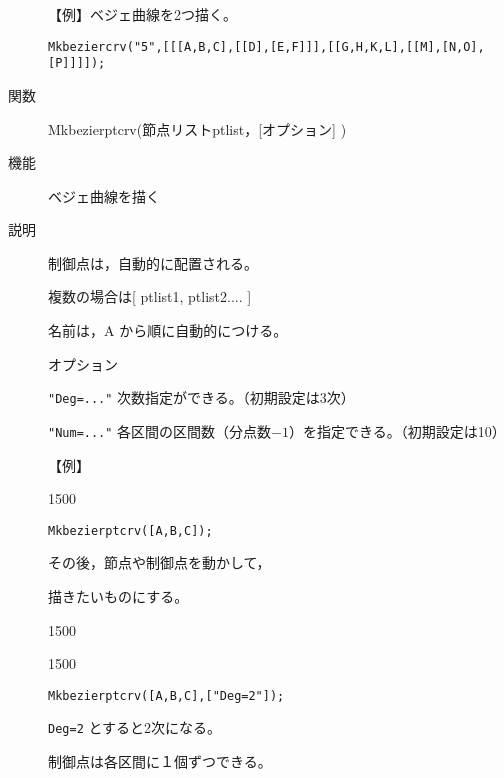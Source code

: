 \documentclass[papersize,a4paper,10pt,uplatex]{jsarticle}
\begin{document}
\begin{description}
\vspace{\baselineskip}
【例】ベジェ曲線を2つ描く。

\verb|Mkbeziercrv("5",[[[A,B,C],[[D],[E,F]]],[[G,H,K,L],[[M],[N,O],[P]]]]);|

 \scalebox{0.95}{}

\vspace{\baselineskip}
\hypertarget{mkbezierptcrv}{}
\item[関数]Mkbezierptcrv(節点リストptlist，[オプション] )
\item[機能]ベジェ曲線を描く
\item[説明]制御点は，自動的に配置される。

複数の場合は[ ptlist1, ptlist2.... ]

名前は，A から順に自動的につける。

オプション

\verb|"Deg=..."| 次数指定ができる。（初期設定は3次）

\verb|"Num=..."| 各区間の区間数（分点数$-1$）を指定できる。（初期設定は10）

\vspace{\baselineskip}

【例】

\begin{layer}{150}{0}
\end{layer}

\verb|Mkbezierptcrv([A,B,C]);|

\vspace{23mm}

その後，節点や制御点を動かして，\par
描きたいものにする。

\begin{layer}{150}{0}
\end{layer}

\vspace{35mm}

\begin{layer}{150}{0}
\end{layer}

\verb|Mkbezierptcrv([A,B,C],["Deg=2"]);|

\verb|Deg=2| とすると2次になる。

制御点は各区間に１個ずつできる。

\vspace{20mm}


\end{description}
\end{document}

